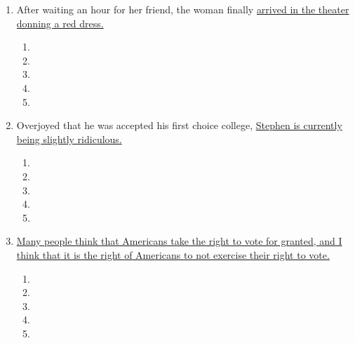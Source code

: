 \documentclass[12pt]{book}
\begin{document}
\begin{enumerate}
\begin{enumerate}
\bigskip
\begin{enumerate}[label=(\Alph*)]

\item        \hrulefill
\item   \hrulefill
\item    \hrulefill
\item    \hrulefill
\item   \hrulefill
\end{enumerate}

\bigskip
\item After waiting an hour for her friend, the woman finally \ul{arrived in the theater donning a red dress.}

\bigskip
\begin{enumerate}[label=(\Alph*)]

\item        \hrulefill
\item   \hrulefill
\item    \hrulefill
\item    \hrulefill
\item   \hrulefill
\end{enumerate}

\bigskip
\item Overjoyed that he was accepted his first choice college, \ul{Stephen is currently being slightly ridiculous.}

\bigskip
\begin{enumerate}[label=(\Alph*)]

\item        \hrulefill
\item   \hrulefill
\item    \hrulefill
\item    \hrulefill
\item   \hrulefill
\end{enumerate}

\bigskip
\item \ul{Many people think that Americans take the right to vote for granted, and I think that it is the right of Americans to not exercise their right to vote.}

\bigskip
\begin{enumerate}[label=(\Alph*)]

\item        \hrulefill
\item   \hrulefill
\item    \hrulefill
\item    \hrulefill
\item   \hrulefill
\end{enumerate}


\end{enumerate}
\end{enumerate}
\end{document}
